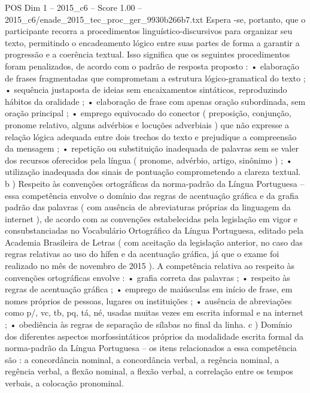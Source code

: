 \begin{textsample}{POS Dim 1 – 2015\_c6 – Score 1.00 – 2015\_c6/enade\_2015\_tec\_proc\_ger\_9930b266b7.txt}
Espera -se, portanto, que o participante recorra a procedimentos linguístico-discursivos para organizar seu texto, permitindo o encadeamento lógico entre suas partes de forma a garantir a progressão e a coerência textual.
Isso significa que os seguintes procedimentos foram penalizados, de acordo com o padrão de resposta proposto : • elaboração de frases fragmentadas que comprometam a estrutura lógico-gramatical do texto ; • sequência justaposta de ideias sem encaixamentos sintáticos, reproduzindo hábitos da oralidade ; • elaboração de frase com apenas oração subordinada, sem oração principal ; • emprego equivocado do conector ( preposição, conjunção, pronome relativo, alguns advérbios e locuções adverbiais ) que não expresse a relação lógica adequada entre dois trechos do texto e prejudique a compreensão da mensagem ; • repetição ou substituição inadequada de palavras sem se valer dos recursos oferecidos pela língua ( pronome, advérbio, artigo, sinônimo ) ; • utilização inadequada dos sinais de pontuação comprometendo a clareza textual. b ) Respeito às convenções ortográficas da norma-padrão da Língua Portuguesa – essa competência envolve o domínio das regras de acentuação gráfica e da grafia padrão das palavras ( com ausência de abreviaturas próprias da linguagem da internet ), de acordo com as convenções estabelecidas pela legislação em vigor e consubstanciadas no Vocabulário Ortográfico da Língua Portuguesa, editado pela Academia Brasileira de Letras ( com aceitação da legislação anterior, no caso das regras relativas ao uso do hífen e da acentuação gráfica, já que o exame foi realizado no mês de novembro de 2015 ).
A competência relativa ao respeito às convenções ortográficas envolve : • grafia correta das palavras ; • respeito às regras de acentuação gráfica ; • emprego de maiúsculas em início de frase, em nomes próprios de pessoas, lugares ou instituições ; • ausência de abreviações como p/, vc, tb, pq, tá, né, usadas muitas vezes em escrita informal e na internet ; • obediência às regras de separação de sílabas no final da linha. c ) Domínio dos diferentes aspectos morfossintáticos próprios da modalidade escrita formal da norma-padrão da Língua Portuguesa – os itens relacionados a essa competência são : a concordância nominal, a concordância verbal, a regência nominal, a regência verbal, a flexão nominal, a flexão verbal, a correlação entre os tempos verbais, a colocação pronominal.

\end{textsample}
